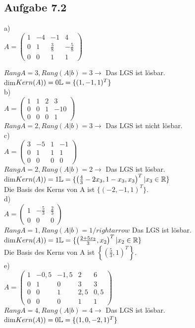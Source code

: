 \documentclass{standalone}
\begin{document}
\subsection{Aufgabe 7.2}

a)\\
$A=\left(\begin{array}{ccc|c}
	1	&-4	&-1				&4			\\
	0	&1	&\frac{3}{8}	&-\frac{5}{8}\\
	0	&0	&1				&1
\end{array}\right)$

$RangA=3, Rang(A|b)=3 \rightarrow$
Das LGS ist lösbar.\\
dim$Kern(A))=0\\
\mathbb{L}=\{(1, -1, 1)^T\}$\\


b)\\
$A=\left(\begin{array}{ccc|c}
	1	&1	&2				&3		\\
	0	&0	&1				&-10	\\
	0	&0	&0				&1
\end{array}\right)$\\

$RangA=2, Rang(A|b)=3 \rightarrow$
Das LGS ist nicht lösbar.\\


c)\\
$A=\left(\begin{array}{ccc|c}
	3	&-5	&1				&-1		\\
	0	&1	&1				&1		\\
	0	&0	&0				&0
\end{array}\right)$\\

$RangA=2, Rang(A|b)=2 \rightarrow$
Das LGS ist lösbar.\\
dim$Kern(A))=1\\
\mathbb{L}=\{\left(\frac{4}{3}-2x_3, 1-x_3, x_3\right)^T | x_3 \in \mathbb{R}\}$\\
Die Basis des Kerns von A ist $\{(-2, -1, 1)^T\}$.\\


d)\\
$A=\left(\begin{array}{cc|c}
	1	&-\frac{5}{3}	&\frac{2}{3}\\
	0	&0				&0
\end{array}\right)$\\

$RangA=1, Rang(A|b)=1 /rightarrow$
Das LGS ist lösbar.\\
dim$Kern(A))=1\\
\mathbb{L}=\{\left(\frac{2+5x_2}{3}, x_2\right)^T | x_2 \in \mathbb{R}\}$\\
Die Basis des Kerns von A ist $\left\{\left(\frac{5}{3}, 1\right)^T\right\}$.\\


e)\\
$A=\left(\begin{array}{cccc|c}
	1	&-0,5	&-1,5	&2		&6	\\
	0	&1		&0		&3		&3	\\
	0	&0		&1		&2,5	&0,5\\
	0	&0		&0		&1		&1
\end{array}\right)$\\

$RangA=4, Rang(A|b)=4 \rightarrow$
Das LGS ist lösbar.\\
dim$Kern(A))=0\\
\mathbb{L}=\{(1, 0, -2, 1)^T\}$\\
\end{document}
